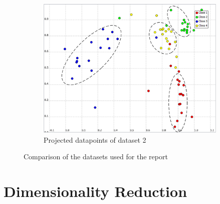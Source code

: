 \documentclass[a4paper,10pt]{article}
\begin{document}
\begin{figure}[H]
\begin{subfigure}[t]{0.3\textwidth}
      \includegraphics[width=\textwidth]{pictures/dataset_new_2}
      \caption{Projected datapoints of dataset 2}
      \label{fig:dataset_new_2}
    \end{subfigure}%
  \caption{Comparison of the datasets used for the report}
\end{figure}


\section{Dimensionality Reduction}
\end{document}
